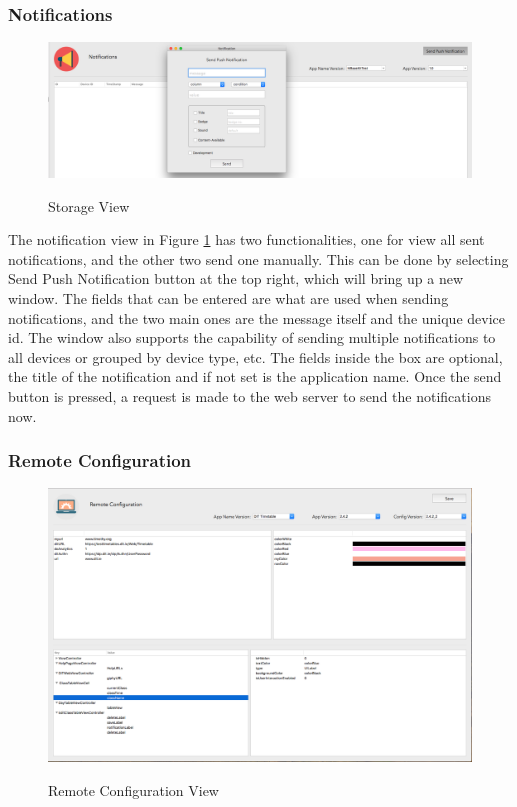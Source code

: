 \subsubsection{Notifications}

\begin{figure}[!h]
    \caption{Storage View}
    \centering
    \includegraphics[width=120mm]{images/dashboard/notifications}
    \label{fig:notification}
\end{figure}

The notification view in Figure \ref{fig:notification} has two functionalities, one for view all sent notifications, and the other two send one manually. This can be done by selecting Send Push Notification button at the top right, which will bring up a new window. The fields that can be entered are what are used when sending notifications, and the two main ones are the message itself and the unique device id. The window also supports the capability of sending multiple notifications to all devices or grouped by device type, etc. The fields inside the box are optional, the title of the notification and if not set is the application name. Once the send button is pressed, a request is made to the web server to send the notifications now.

\subsubsection{Remote Configuration}

\begin{figure}[!h]
    \caption{Remote Configuration View}
    \centering
    \includegraphics[width=150mm]{images/dashboard/remote-config}
    \label{fig:remote-config-view}
\end{figure}


